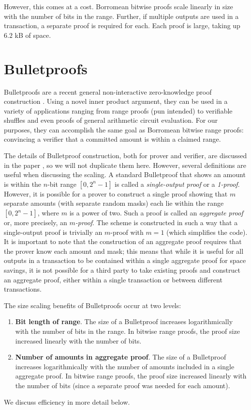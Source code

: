 \documentclass{mrl}
\begin{document}
However, this comes at a cost. Borromean bitwise proofs scale linearly in size with the number of bits in the range. Further, if multiple outputs are used in a transaction, a separate proof is required for each. Each proof is large, taking up $6.2$ kB of space.

\section{Bulletproofs}
Bulletproofs are a recent general non-interactive zero-knowledge proof construction \cite{bp}. Using a novel inner product argument, they can be used in a variety of applications ranging from range proofs (pun intended) to verifiable shuffles and even proofs of general arithmetic circuit evaluation. For our purposes, they can accomplish the same goal as Borromean bitwise range proofs: convincing a verifier that a committed amount is within a claimed range.

The details of Bulletproof construction, both for prover and verifier, are discussed in the paper \cite{bp}, so we will not duplicate them here. However, several definitions are useful when discussing the scaling. A standard Bulletproof that shows an amount is within the $n$-bit range $[0,2^n-1]$ is called a \textit{single-output proof} or a \textit{1-proof}. However, it is possible for a prover to construct a single proof showing that $m$ separate amounts (with separate random masks) each lie within the range $[0,2^n-1]$, where $m$ is a power of two. Such a proof is called an \textit{aggregate proof} or, more precisely, an $m$\textit{-proof}. The scheme is constructed in such a way that a single-output proof is trivially an $m$-proof with $m=1$ (which simplifies the code). It is important to note that the construction of an aggregate proof requires that the prover know each amount and mask; this means that while it is useful for all outputs in a transaction to be contained within a single aggregate proof for space savings, it is not possible for a third party to take existing proofs and construct an aggregate proof, either within a single transaction or between different transactions.

The size scaling benefits of Bulletproofs occur at two levels:
\begin{enumerate}
\item \textbf{Bit length of range}. The size of a Bulletproof increases logarithmically with the number of bits in the range. In bitwise range proofs, the proof size increased linearly with the number of bits.
\item \textbf{Number of amounts in aggregate proof}. The size of a Bulletproof increases logarithmically with the number of amounts included in a single aggregate proof. In bitwise range proofs, the proof size increased linearly with the number of bits (since a separate proof was needed for each amount).
\end{enumerate}
We discuss efficiency in more detail below.
\end{document}
